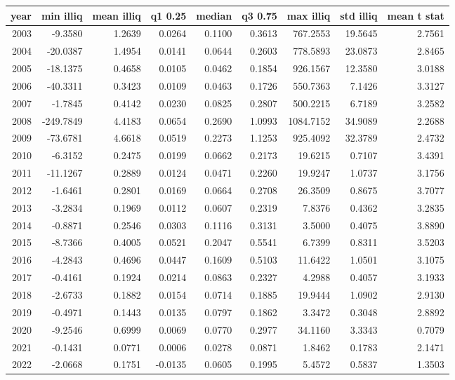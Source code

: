 \begin{tabular}{rrrrrrrrr}
\toprule
year & min illiq & mean illiq & q1 0.25 & median & q3 0.75 & max illiq & std illiq & mean t stat \\
\midrule
2003 & -9.3580 & 1.2639 & 0.0264 & 0.1100 & 0.3613 & 767.2553 & 19.5645 & 2.7561 \\
2004 & -20.0387 & 1.4954 & 0.0141 & 0.0644 & 0.2603 & 778.5893 & 23.0873 & 2.8465 \\
2005 & -18.1375 & 0.4658 & 0.0105 & 0.0462 & 0.1854 & 926.1567 & 12.3580 & 3.0188 \\
2006 & -40.3311 & 0.3423 & 0.0109 & 0.0463 & 0.1726 & 550.7363 & 7.1426 & 3.3127 \\
2007 & -1.7845 & 0.4142 & 0.0230 & 0.0825 & 0.2807 & 500.2215 & 6.7189 & 3.2582 \\
2008 & -249.7849 & 4.4183 & 0.0654 & 0.2690 & 1.0993 & 1084.7152 & 34.9089 & 2.2688 \\
2009 & -73.6781 & 4.6618 & 0.0519 & 0.2273 & 1.1253 & 925.4092 & 32.3789 & 2.4732 \\
2010 & -6.3152 & 0.2475 & 0.0199 & 0.0662 & 0.2173 & 19.6215 & 0.7107 & 3.4391 \\
2011 & -11.1267 & 0.2889 & 0.0124 & 0.0471 & 0.2260 & 19.9247 & 1.0737 & 3.1756 \\
2012 & -1.6461 & 0.2801 & 0.0169 & 0.0664 & 0.2708 & 26.3509 & 0.8675 & 3.7077 \\
2013 & -3.2834 & 0.1969 & 0.0112 & 0.0607 & 0.2319 & 7.8376 & 0.4362 & 3.2835 \\
2014 & -0.8871 & 0.2546 & 0.0303 & 0.1116 & 0.3131 & 3.5000 & 0.4075 & 3.8890 \\
2015 & -8.7366 & 0.4005 & 0.0521 & 0.2047 & 0.5541 & 6.7399 & 0.8311 & 3.5203 \\
2016 & -4.2843 & 0.4696 & 0.0447 & 0.1609 & 0.5103 & 11.6422 & 1.0501 & 3.1075 \\
2017 & -0.4161 & 0.1924 & 0.0214 & 0.0863 & 0.2327 & 4.2988 & 0.4057 & 3.1933 \\
2018 & -2.6733 & 0.1882 & 0.0154 & 0.0714 & 0.1885 & 19.9444 & 1.0902 & 2.9130 \\
2019 & -0.4971 & 0.1443 & 0.0135 & 0.0797 & 0.1862 & 3.3472 & 0.3048 & 2.8892 \\
2020 & -9.2546 & 0.6999 & 0.0069 & 0.0770 & 0.2977 & 34.1160 & 3.3343 & 0.7079 \\
2021 & -0.1431 & 0.0771 & 0.0006 & 0.0278 & 0.0871 & 1.8462 & 0.1783 & 2.1471 \\
2022 & -2.0668 & 0.1751 & -0.0135 & 0.0605 & 0.1995 & 5.4572 & 0.5837 & 1.3503 \\
\bottomrule
\end{tabular}
